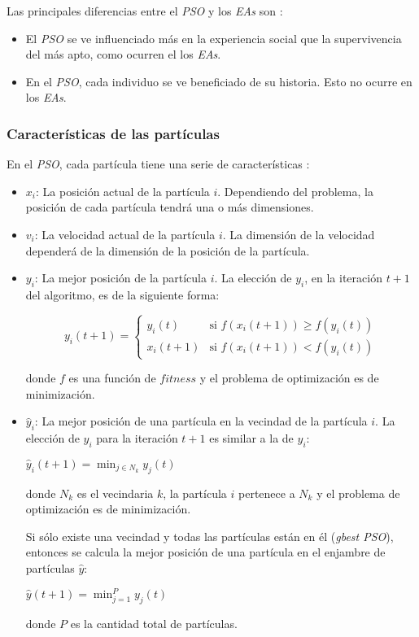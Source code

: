     Las principales diferencias entre el \emph{PSO} y los \emph{EAs} son
\cite{PSO_0}:
\begin{itemize}
    \item El \emph{PSO} se ve influenciado más en la experiencia social que la
supervivencia del más apto, como ocurren el los \emph{EAs}.
    \item En el \emph{PSO}, cada individuo se ve beneficiado de su historia. Esto
no ocurre en los \emph{EAs}.
\end{itemize}

\subsubsection{Características de las partículas}

    En el \emph{PSO}, cada partícula tiene una serie de características
\cite{PSO_0}:
\begin{itemize}
    \item $x_i$: La posición actual de la partícula $i$. Dependiendo del
problema, la posición de cada partícula tendrá una o más dimensiones.
    \item $v_i$: La velocidad actual de la partícula $i$. La dimensión de la
velocidad dependerá de la dimensión de la posición de la partícula.
    \item $y_i$: La mejor posición de la partícula $i$. La elección de $y_i$, en
la iteración $t + 1$ del algoritmo, es de la siguiente forma:
\begin{center}
    \[
      y_i(t+1) =
      \begin{cases}
        y_i(t)   & \text{si } f(x_i(t+1)) \geq f(y_i(t)) \\
        x_i(t+1) & \text{si } f(x_i(t+1)) < f(y_i(t))
      \end{cases}
    \]
\end{center}
donde $f$ es una función de $fitness$ y el problema de optimización es de
minimización.
    \item $\hat{y}_i$: La mejor posición de una partícula en la vecindad de la
partícula $i$. La elección de $\hat{y}_i$ para la iteración $t + 1$ es similar a
la de $y_i$:
\begin{center}
    $\hat{y}_i(t + 1) = \displaystyle\min_{j \in N_k} y_j(t)$
\end{center}
donde $N_k$ es el vecindaria $k$, la partícula $i$ pertenece a $N_k$ y el
problema de optimización es de minimización.

    Si sólo existe una vecindad y todas las partículas están en él
(\emph{gbest PSO}), entonces se calcula la mejor posición de una partícula en el
enjambre de partículas $\hat{y}$:
\begin{center}
    $\hat{y}(t + 1) = \displaystyle\min_{j = 1}^{P} y_j(t)$
\end{center}
donde $P$ es la cantidad total de partículas.
\end{itemize}

